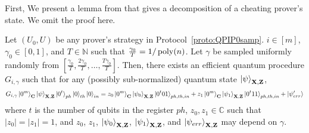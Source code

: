 First, We present a lemma from \cite{parallelrep}  that gives a decomposition of a cheating prover's state. We omit the proof here.

\begin{lemma}\label{lem:partition}
Let $(U_0,U)$ be any prover's strategy in Protocol~\ref{proto:QPIP0samp}.  $i\in[m]$, 
$\gamma_0 \in[0,1]$, and $T\in \mathbb{N}$ such that $\frac{\gamma_0}{T}=1/\operatorname*{\operatorname{poly}}(n)$. Let $\gamma$ be sampled uniformly randomly from $[\frac{\gamma_0}{T},\frac{2\gamma_0}{T},\dots,\frac{T\gamma_0}{T}]$. Then, there exists an efficient quantum procedure $G_{i,\gamma}$ such that for any (possibly sub-normalized) quantum state $\ket{\psi}_{\mathbf{X},\mathbf{Z}}$,  
\begin{align*}
    G_{i,\gamma} \ket{0^m}_{\mathbf{C}}\ket{\psi}_{\mathbf{X},\mathbf{Z}}\ket{0^t}_{ph}\ket{0}_{th}\ket{0}_{in} = z_0\ket{0^m}_{\mathbf{C}}\ket{\psi_{0}}_{\mathbf{X},\mathbf{Z}}\ket{0^t01}_{ph,th,in}+ z_1\ket{0^m}_{\mathbf{C}}\ket{\psi_{1}}_{\mathbf{X},\mathbf{Z}}\ket{0^t11}_{ph,th,in} + \ket{\psi'_{err}}
\end{align*}
where $t$ is the number of qubits in the register $ph$, $z_0,z_1\in \mathbb{C}$ such that $|z_0|=|z_1|=1$, and 
$z_0$, $z_1$, $\ket{\psi_0}_{\mathbf{X},\mathbf{Z}}$, $\ket{\psi_1}_{\mathbf{X},\mathbf{Z}}$, and $\ket{\psi_{err}}_{\mathbf{X},\mathbf{Z}}$ may depend on $\gamma$.


\end{lemma}
